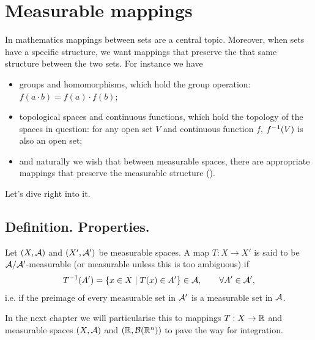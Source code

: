 
\chapter{Measurable mappings}

In mathematics mappings between sets are a central topic. Moreover, when sets have a specific structure, we want mappings that preserve the that same structure between the two sets. For instance we have
\begin{itemize}
	\item groups and homomorphisms, which hold the group operation: $f(a \cdot b) = f(a) \cdot f(b)$;
	\item topological spaces and continuous functions, which hold the topology of the spaces in question: for any open set $V$ and continuous function $f$, ${f}^{-1}(V)$ is also an open set;
	\item and naturally we wish that between measurable spaces, there are appropriate mappings that preserve the measurable structure (\siga).
\end{itemize}

Let's dive right into it.

\section{Definition. Properties.}

\begin{dfn}
	Let $(X, \mathcal{A})$ and $(X', \mathcal{A}')$ be measurable spaces. A map $T : X \to X'$ is said to be $\mathcal{A}/\mathcal{A}'$-measurable (or measurable unless this is too ambiguous) if
	\begin{align*}
		{T}^{-1}(A') = \{x \in X \mid T(x) \in A'\} \in \mathcal{A},\qquad \forall A' \in \mathcal{A}',
	\end{align*}
	i.e. if the preimage of every measurable set in $\mathcal{A}'$ is a measurable set in $\mathcal{A}$.
\end{dfn}

In the next chapter we will particularise this to mappings $T:X \to \mathbb{R}$ and measurable spaces $(X, \mathcal{A})$ and $(\mathbb{R}, \mathcal{B}(\mathbb{R}^n))$ to pave the way for integration.

